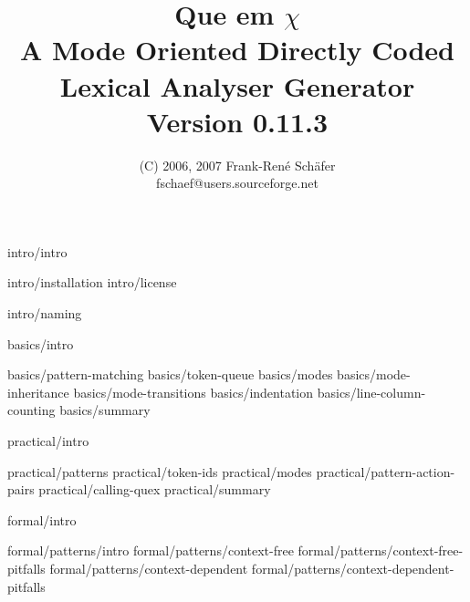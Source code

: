 \documentclass{scrbook}
\title{\bf \Huge {Que{\raise 0.2 em \hbox{$\chi$}}} \\ 
       A Mode Oriented Directly Coded\\
       Lexical Analyser Generator \\
       Version 0.11.3}
\author{\fourteenhelvetica (C) 2006, 2007 Frank-Ren\'{e} Sch\"{a}fer\\
        fschaef@users.sourceforge.net}
\def\Quex{{Que{\raise 0.2em \hbox{$\chi$}}}}
\begin{document}
\twelvehelvetica

\maketitle

\tableofcontents

          {intro/intro}

            {intro/installation}
            {intro/license}

            {intro/naming}

          {basics/intro}

            {basics/pattern-matching}
            {basics/token-queue}
            {basics/modes}
                  {basics/mode-inheritance}
                  {basics/mode-transitions}
            {basics/indentation}
            {basics/line-column-counting}
            {basics/summary}

          {practical/intro}

            {practical/patterns}
            {practical/token-ids}
            {practical/modes}
            {practical/pattern-action-pairs}
            {practical/calling-quex}
            {practical/summary}

          {formal/intro}

            {formal/patterns/intro}
                  {formal/patterns/context-free}     
                        {formal/patterns/context-free-pitfalls}	
                  {formal/patterns/context-dependent}     
                        {formal/patterns/context-dependent-pitfalls}	
\end{document}
